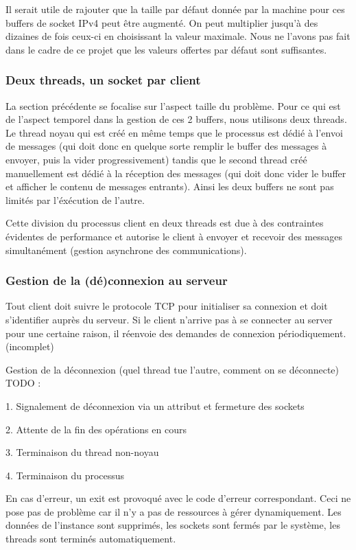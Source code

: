 \documentclass{article}
\begin{document}
Il serait utile de rajouter que la taille par défaut donnée par la machine pour ces buffers de socket IPv4 peut être augmenté. On peut multiplier jusqu'à des dizaines de fois ceux-ci en choisissant la valeur maximale. Nous ne l'avons pas fait dans le cadre de ce projet que les valeurs offertes par défaut sont suffisantes.



\subsubsection{Deux threads, un socket par client}
 La section précédente se focalise sur l'aspect taille du problème. Pour ce qui est de l'aspect temporel dans la gestion de ces 2 buffers, nous utilisons deux threads. Le thread noyau qui est créé en même temps que le processus est dédié à l'envoi de messages (qui doit donc en quelque sorte remplir le buffer des messages à envoyer, puis la vider progressivement) tandis que le second thread créé manuellement est dédié à la réception des messages (qui doit donc vider le buffer et afficher le contenu de messages entrants). Ainsi les deux buffers ne sont pas limités par l'éxécution de l'autre.


 \noindent Cette division du processus client en deux threads est due à des contraintes évidentes de performance et autorise le client à envoyer et recevoir des messages simultanément (gestion asynchrone des communications).



\subsubsection{Gestion de la (dé)connexion au serveur}
\noindent Tout client doit suivre le protocole TCP \cite{TCP-IP} pour initialiser sa connexion et doit s'identifier auprès du serveur. Si le client n'arrive pas à se connecter au server pour une certaine raison, il réenvoie des demandes de connexion périodiquement.
(incomplet)


 Gestion de la déconnexion (quel thread tue l'autre, comment on se déconnecte) TODO :

1. Signalement de déconnexion via un attribut et fermeture des sockets

2. Attente de la fin des opérations en cours

3. Terminaison du thread non-noyau

4. Terminaison du processus

En cas d'erreur, un exit est provoqué avec le code d'erreur correspondant. Ceci ne pose pas de problème car il n'y a pas de ressources à gérer dynamiquement. Les données de l'instance sont supprimés, les sockets sont fermés par le système, les threads sont terminés automatiquement.
\end{document}
